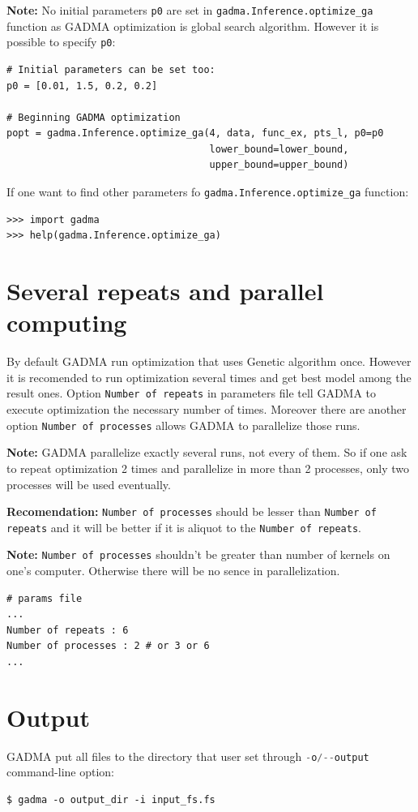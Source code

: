 \documentclass[12pt]{article}
\makeatletter
\newcommand{\py}[1]{\lstinline[language=Python, showstringspaces=False]@#1@}
\makeatother
\begin{document}
\textbf{Note: } No initial parameters \py{p0} are set in \py{gadma.Inference.optimize_ga} function as GADMA optimization is global search algorithm. However it is possible to specify \py{p0}:
\begin{lstlisting}
# Initial parameters can be set too:
p0 = [0.01, 1.5, 0.2, 0.2]

# Beginning GADMA optimization
popt = gadma.Inference.optimize_ga(4, data, func_ex, pts_l, p0=p0
                                   lower_bound=lower_bound,
                                   upper_bound=upper_bound)
\end{lstlisting}

If one want to find other parameters fo \py{gadma.Inference.optimize_ga} function:

\begin{lstlisting}
>>> import gadma
>>> help(gadma.Inference.optimize_ga)
\end{lstlisting}

\section{Several repeats and parallel computing}

By default GADMA run optimization that uses Genetic algorithm once. However it is recomended to run optimization several times and get best model among the result ones. Option \py{Number of repeats} in parameters file tell GADMA to execute optimization the necessary number of times. Moreover there are another option \py{Number of processes} allows GADMA to parallelize those runs. 

\textbf{Note: } GADMA parallelize exactly several runs, not every of them. So if one ask to repeat optimization 2 times and parallelize in more than 2 processes, only two processes will be used eventually. 

\textbf{Recomendation: } \py{Number of processes} should be lesser than \py{Number of repeats} and it will be better if it is aliquot to the \py{Number of repeats}.

\textbf{Note: } \py{Number of processes} shouldn't be greater than number of kernels on one's computer. Otherwise there will be no sence in parallelization.

\begin{lstlisting}
# params file
...
Number of repeats : 6
Number of processes : 2 # or 3 or 6
...
\end{lstlisting}

\section{Output}
GADMA put all files to the directory that user set through \py{-o/--output} command-line option:
\begin{lstlisting}
$ gadma -o output_dir -i input_fs.fs
\end{lstlisting}
\end{document}
